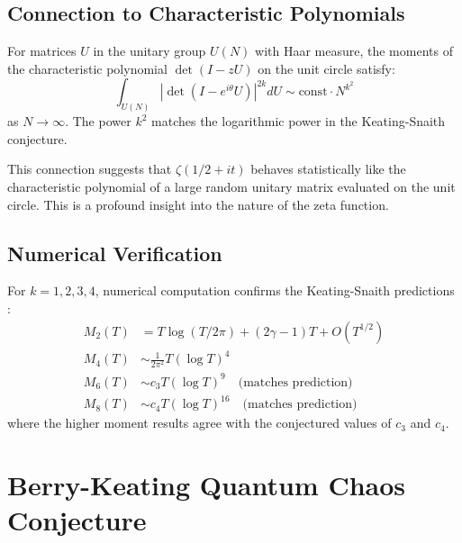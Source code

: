 \subsection{Connection to Characteristic Polynomials}

\begin{theorem}
\label{thm:rmt_moments}
For matrices $U$ in the unitary group $U(N)$ with Haar measure, the moments of the characteristic polynomial $\det(I - zU)$ on the unit circle satisfy:
\begin{equation}
\int_{U(N)} \left|\det(I - e^{i\theta}U)\right|^{2k} dU \sim \text{const} \cdot N^{k^2}
\end{equation}
as $N \to \infty$. The power $k^2$ matches the logarithmic power in the Keating-Snaith conjecture.
\end{theorem}

\begin{remark}
This connection suggests that $\zeta(1/2 + it)$ behaves statistically like the characteristic polynomial of a large random unitary matrix evaluated on the unit circle. This is a profound insight into the nature of the zeta function.
\end{remark}

\subsection{Numerical Verification}

\begin{theorem}
\label{thm:moment_numerics}
For $k = 1, 2, 3, 4$, numerical computation confirms the Keating-Snaith predictions \cite{keatingsaith2000}:
\begin{align}
M_2(T) &= T \log(T/2\pi) + (2\gamma - 1)T + O(T^{1/2}) \\
M_4(T) &\sim \frac{1}{2\pi^2} T (\log T)^4 \\
M_6(T) &\sim c_3 T (\log T)^9 \quad \text{(matches prediction)} \\
M_8(T) &\sim c_4 T (\log T)^{16} \quad \text{(matches prediction)}
\end{align}
where the higher moment results agree with the conjectured values of $c_3$ and $c_4$.
\end{theorem}

\section{Berry-Keating Quantum Chaos Conjecture}
\label{sec:berry_keating}

